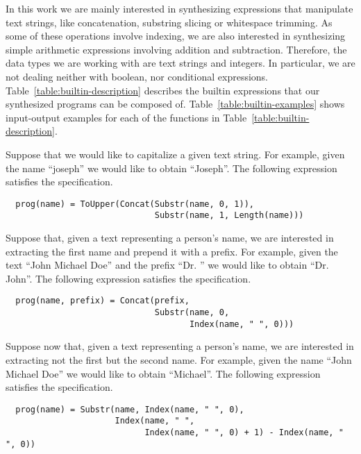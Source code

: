 In this work we are mainly interested in synthesizing expressions that
manipulate text strings, like concatenation, substring slicing or whitespace
trimming. As some of these operations involve indexing, we are also interested
in synthesizing simple arithmetic expressions involving addition and
subtraction. Therefore, the data types we are working with are text strings and
integers. In particular, we are not dealing neither with boolean, nor conditional
expressions. Table~\ref{table:builtin-description} describes the builtin
expressions that our synthesized programs can be composed of.
Table~\ref{table:builtin-examples} shows input-output examples for each of the
functions in Table~\ref{table:builtin-description}.

\begin{example}
  Suppose that we would like to capitalize a given text string. For example,
given the name ``joseph'' we would like to obtain ``Joseph''. The following
expression satisfies the specification.

\begin{lstlisting}
  prog(name) = ToUpper(Concat(Substr(name, 0, 1)),
                              Substr(name, 1, Length(name)))
\end{lstlisting}
\end{example}

\begin{example}\label{ex:first-name}
  Suppose that, given a text representing a person's name, we are interested in
extracting the first name and prepend it with a prefix. For example, given the
text ``John Michael Doe'' and the prefix ``Dr. '' we would like to obtain
``Dr. John''. The following expression satisfies the specification.
 
\begin{lstlisting}
  prog(name, prefix) = Concat(prefix,
                              Substr(name, 0,
                                     Index(name, " ", 0)))
\end{lstlisting}
\end{example}

\begin{example}\label{ex:second-name}
  Suppose now that, given a text representing a person's name, we are interested
in extracting not the first but the second name. For example, given the name
``John Michael Doe'' we would like to obtain ``Michael''. The following
expression satisfies the specification.
 
\begin{lstlisting}
  prog(name) = Substr(name, Index(name, " ", 0),
                      Index(name, " ",
                            Index(name, " ", 0) + 1) - Index(name, " ", 0))
\end{lstlisting}
\end{example}

